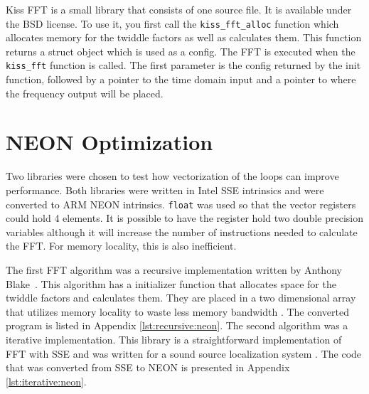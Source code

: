 Kiss FFT is a small library that consists of one source file. It is available under the BSD license. To use it, you first call the \texttt{kiss\_fft\_alloc} function which allocates memory for the twiddle factors as well as calculates them. This function returns a struct object which is used as a config. The FFT is executed when the \texttt{kiss\_fft} function is called. The first parameter is the config returned by the init function, followed by a pointer to the time domain input and a pointer to where the frequency output will be placed.




\section{NEON Optimization}

Two libraries were chosen to test how vectorization of the loops can improve performance. Both libraries were written in Intel SSE intrinsics and were converted to ARM NEON intrinsics. \texttt{float} was used so that the vector registers could hold 4 elements. It is possible to have the register hold two double precision variables although it will increase the number of instructions needed to calculate the FFT. For memory locality, this is also inefficient.

The first FFT algorithm was a recursive implementation written by Anthony Blake~\cite{neon:recursive}. This algorithm has a initializer function that allocates space for the twiddle factors and calculates them. They are placed in a two dimensional array that utilizes memory locality to waste less memory bandwidth \cite{neon:recursive:details}. The converted program is listed in Appendix \ref{lst:recursive:neon}. The second algorithm was a iterative implementation. This library is a straightforward implementation of FFT with SSE \cite{code:manyears} and was written for a sound source localization system \cite{manyears:site}. The code that was converted from SSE to NEON is presented in Appendix \ref{lst:iterative:neon}.
